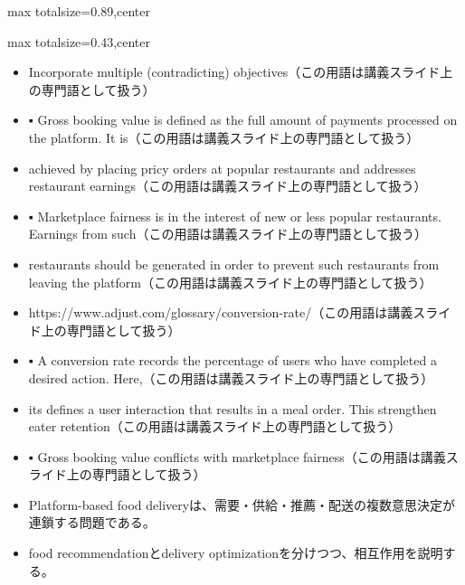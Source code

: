 \begin{minipage}[t]{0.58\textwidth}
\begin{adjustbox}{max totalsize={\textwidth}{0.89\textheight},center}
\begin{minipage}{\textwidth}
\end{minipage}
\end{adjustbox}
\end{minipage}


\clearpage
{}
\begin{minipage}[t]{0.405\textwidth}
\begin{adjustbox}{max totalsize={\textwidth}{0.43\textheight},center}
\begin{minipage}{\textwidth}\scriptsize
{}\begin{itemize}
\item Incorporate multiple (contradicting) objectives（この用語は講義スライド上の専門語として扱う）
\item ▪ Gross booking value is defined as the full amount of payments processed on the platform. It is（この用語は講義スライド上の専門語として扱う）
\item achieved by placing pricy orders at popular restaurants and addresses restaurant earnings（この用語は講義スライド上の専門語として扱う）
\item ▪ Marketplace fairness is in the interest of new or less popular restaurants. Earnings from such（この用語は講義スライド上の専門語として扱う）
\item restaurants should be generated in order to prevent such restaurants from leaving the platform（この用語は講義スライド上の専門語として扱う）
\item https://www.adjust.com/glossary/conversion-rate/（この用語は講義スライド上の専門語として扱う）
\item ▪ A conversion rate records the percentage of users who have completed a desired action. Here,（この用語は講義スライド上の専門語として扱う）
\item its defines a user interaction that results in a meal order. This strengthen eater retention（この用語は講義スライド上の専門語として扱う）
\item ▪ Gross booking value conflicts with marketplace fairness（この用語は講義スライド上の専門語として扱う）
\end{itemize}\begin{itemize}
\item Platform-based food deliveryは、需要・供給・推薦・配送の複数意思決定が連鎖する問題である。
\item food recommendationとdelivery optimizationを分けつつ、相互作用を説明する。
\end{itemize}
\end{minipage}
\end{adjustbox}
\end{minipage}\hfill
